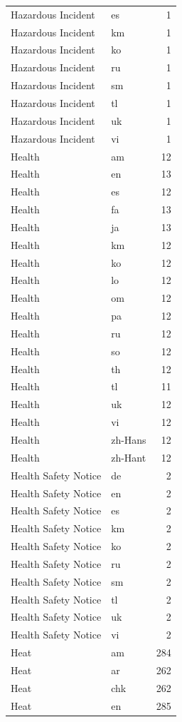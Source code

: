 \begin{longtable}{p{3cm} p{3cm} r}
Hazardous Incident & es & 1 \\
Hazardous Incident & km & 1 \\
Hazardous Incident & ko & 1 \\
Hazardous Incident & ru & 1 \\
Hazardous Incident & sm & 1 \\
Hazardous Incident & tl & 1 \\
Hazardous Incident & uk & 1 \\
Hazardous Incident & vi & 1 \\
Health & am & 12 \\
Health & en & 13 \\
Health & es & 12 \\
Health & fa & 13 \\
Health & ja & 13 \\
Health & km & 12 \\
Health & ko & 12 \\
Health & lo & 12 \\
Health & om & 12 \\
Health & pa & 12 \\
Health & ru & 12 \\
Health & so & 12 \\
Health & th & 12 \\
Health & tl & 11 \\
Health & uk & 12 \\
Health & vi & 12 \\
Health & zh-Hans & 12 \\
Health & zh-Hant & 12 \\
Health Safety Notice & de & 2 \\
Health Safety Notice & en & 2 \\
Health Safety Notice & es & 2 \\
Health Safety Notice & km & 2 \\
Health Safety Notice & ko & 2 \\
Health Safety Notice & ru & 2 \\
Health Safety Notice & sm & 2 \\
Health Safety Notice & tl & 2 \\
Health Safety Notice & uk & 2 \\
Health Safety Notice & vi & 2 \\
Heat & am & 284 \\
Heat & ar & 262 \\
Heat & chk & 262 \\
Heat & en & 285 \\

\end{longtable}
